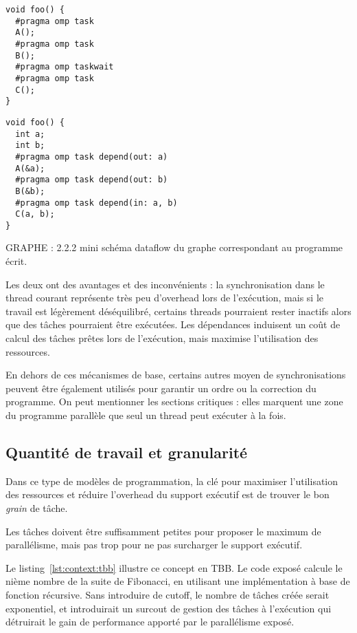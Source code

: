\begin{lstlisting}[caption=Synchronisation dans le thread courant (OpenMP),label=lst:context:task-wait]
void foo() {
  #pragma omp task
  A();
  #pragma omp task
  B();
  #pragma omp taskwait
  #pragma omp task
  C();
}
\end{lstlisting}

\begin{lstlisting}[caption=Synchronisation via des dépendances (OpenMP),label=lst:context:task-dep]
void foo() {
  int a;
  int b;
  #pragma omp task depend(out: a)
  A(&a);
  #pragma omp task depend(out: b)
  B(&b);
  #pragma omp task depend(in: a, b)
  C(a, b);
}
\end{lstlisting}

GRAPHE : 2.2.2 mini schéma dataflow du graphe correspondant au programme écrit.

Les deux ont des avantages et des inconvénients : la synchronisation dans le thread courant représente très peu d'overhead lors de l'exécution, mais si le travail est légèrement déséquilibré, certains threads pourraient rester inactifs alors que des tâches pourraient être exécutées.
Les dépendances induisent un coût de calcul des tâches prêtes lors de l'exécution, mais maximise l'utilisation des ressources.

En dehors de ces mécanismes de base, certains autres moyen de synchronisations peuvent être également utilisés pour garantir un ordre ou la correction du programme.
On peut mentionner les sections critiques : elles marquent une zone du programme parallèle que seul un thread peut exécuter à la fois.


\subsection{Quantité de travail et granularité}

Dans ce type de modèles de programmation, la clé pour maximiser l'utilisation des ressources et réduire l'overhead du support exécutif est de trouver le bon \emph{grain} de tâche.

Les tâches doivent être suffisamment petites pour proposer le maximum de parallélisme, mais pas trop pour ne pas surcharger le support exécutif.

Le listing~\ref{lst:context:tbb} illustre ce concept en TBB.
Le code exposé calcule le nième nombre de la suite de Fibonacci, en utilisant une implémentation à base de fonction récursive.
Sans introduire de cutoff, le nombre de tâches créée serait exponentiel, et introduirait un surcout de gestion des tâches à l'exécution qui détruirait le gain de performance apporté par le parallélisme exposé.

